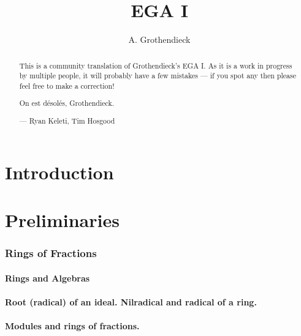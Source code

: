 \documentclass[10pt,oneside]{amsart}
\title{EGA I}
\author{A. Grothendieck}
\begin{document}
\renewcommand{\abstractname}{What this is}
\begin{abstract}
    This is a community translation of Grothendieck's EGA I.
    As it is a work in progress by multiple people, it will probably have a few mistakes --- if you spot any then please feel free to make a correction!
    
    On est désolés, Grothendieck.

    --- Ryan Keleti, Tim Hosgood
\end{abstract}

\maketitle

\noindent\hspace{0.15\linewidth}
\begin{minipage}{0.7\linewidth}
    \tableofcontents{}
\end{minipage}


\clearpage


\part*{Introduction}



\clearpage


\setcounter{part}{-1}

\part{Preliminaries}

    \section{Rings of Fractions}

        \subsection{Rings and Algebras}
        

        \subsection{Root (radical) of an ideal. Nilradical and radical of a ring.}
        

        \subsection{Modules and rings of fractions.}
        
\end{document}
